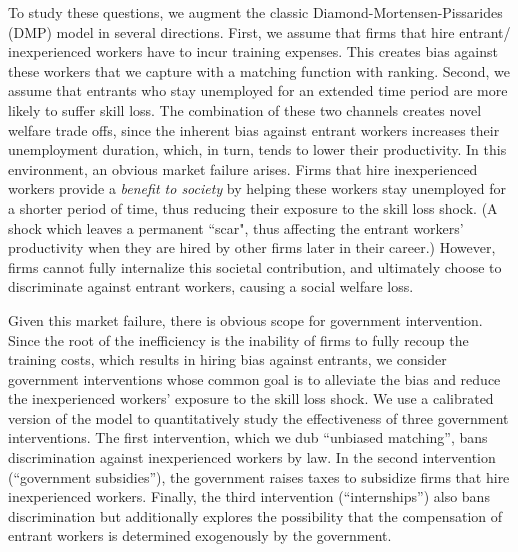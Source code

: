 \documentclass[12pt]{article} %
\theoremstyle{definition}
\begin{document}

To study these questions, we augment the classic Diamond-Mortensen-Pissarides (DMP) model in several directions. First, we assume that firms that hire entrant/ inexperienced workers have to incur training expenses. This creates bias against these workers that we capture with a \cite{petrongolo2001looking} matching function with ranking. Second, we assume that entrants who stay unemployed for an extended time period are more likely to suffer skill loss. The combination of these two channels creates novel welfare trade offs, since the inherent bias against entrant workers increases their unemployment duration, which, in turn, tends to lower their productivity. In this environment, an obvious market failure arises. Firms that hire inexperienced workers provide a \textit{benefit to society} by helping these workers stay unemployed for a shorter period of time, thus reducing their exposure to the skill loss shock. (A shock which leaves a permanent ``scar", thus affecting the entrant workers' productivity when they are hired by other firms later in their career.) However, firms cannot fully internalize this societal contribution, and ultimately choose to discriminate against entrant workers, causing a social welfare loss.  


Given this market failure, there is obvious scope for government intervention.
Since the root of the inefficiency is the inability of firms to fully recoup the training costs, which results in hiring bias against entrants, we consider government interventions whose common goal is to alleviate the bias and reduce the inexperienced workers' exposure to the skill loss shock. 
We use a calibrated version of the model to quantitatively study the effectiveness of three government interventions.
The first intervention, which we dub ``unbiased matching'', bans discrimination against inexperienced workers by law.
In the second intervention (``government subsidies''), the government raises taxes to subsidize firms that hire inexperienced workers.
Finally, the third intervention (``internships'') also bans discrimination but additionally explores the possibility that the compensation of entrant workers is determined exogenously by the government.
\end{document}
